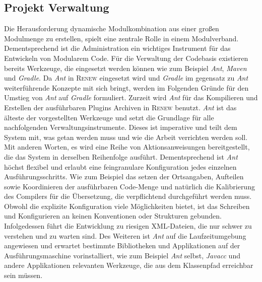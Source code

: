 	\subsection{Projekt Verwaltung} \label{sub:verwaltung} %
		Die Herausforderung dynamische Modulkombination aus einer großen Modulmenge zu erstellen, spielt eine zentrale Rolle in einem Modulverband. Dementsprechend ist die Administration ein wichtiges Instrument für das Entwickeln von Modularem Code.\newline
		Für die Verwaltung der Codebasis existieren bereits Werkzeuge, die eingesetzt werden können wie zum Beispiel \textit{Ant}, \textit{Maven} und \textit{Gradle}. Da \textit{Ant} in \textsc{Renew} eingesetzt wird und \textit{Gradle} im gegensatz zu \textit{Ant} weiterführende Konzepte mit sich bringt, werden im Folgenden Gründe für den Umstieg von \textit{Ant} auf \textit{Gradle} formuliert. \bigbreak
		Zurzeit wird \textit{Ant} für das Kompilieren und Erstellen der ausführbaren Plugins Archiven in \textsc{Renew} benutzt. \textit{Ant} ist das älteste der vorgestellten Werkzeuge und setzt die Grundlage für alle nachfolgenden Verwaltungsinstrumente. Dieses ist imperative und teilt dem System mit, was getan werden muss und wie die Arbeit verrichten werden soll. Mit anderen Worten, es wird eine Reihe von Aktionsanweisungen bereitgestellt, die das System in derselben Reihenfolge ausführt. Dementsprechend ist \textit{Ant} höchst flexibel und erlaubt eine feingranulare Konfiguration jedes einzelnen Ausführungsschritts. Wie zum Beispiel das setzen der Ortsangaben, Aufteilen sowie Koordinieren der ausführbaren Code-Menge und natürlich die Kalibrierung des Compilers für die Übersetzung, die verpflichtend durchgeführt werden muss.\newline 
		Obwohl die explizite Konfiguration viele Möglichkeiten bietet, ist das Schreiben und Konfigurieren an keinen Konventionen oder Strukturen gebunden. Infolgedessen führt die Entwicklung zu riesigen XML-Dateien, die nur schwer zu verstehen und zu warten sind. Des Weiteren ist \textit{Ant} auf die Laufzeitumgebung angewiesen und erwartet bestimmte Bibliotheken und Applikationen auf der Ausführungsmaschine vorinstalliert, wie zum Beispiel \textit{Ant} selbst, \textit{Javacc} und andere Applikationen relevanten Werkzeuge, die aus dem Klassenpfad erreichbar sein müssen. \bigbreak
